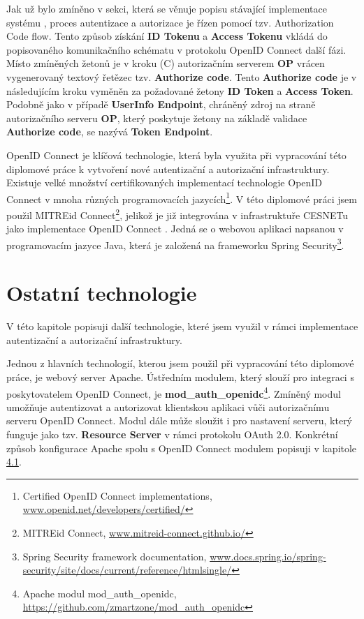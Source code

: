 \documentclass[
  printed, %
  twoside, %
  table,   %
  nolof,     %
  nolot,     %
]{fithesis3}
\begin{document}
Jak už bylo zmíněno v sekci, která se věnuje popisu stávající implementace systému , proces autentizace a autorizace je řízen pomocí tzv. Authorization Code flow. Tento způsob získání \textbf{ID Tokenu} a \textbf{Access Tokenu} vkládá do popisovaného komunikačního schématu v protokolu OpenID Connect další fázi. Místo zmíněných žetonů je v kroku (C) autorizačním serverem \textbf{OP} vrácen vygenerovaný textový řetězec tzv. \textbf{Authorize code}. Tento \textbf{Authorize code} je v následujícím kroku vyměněn za požadované žetony \textbf{ID Token} a \textbf{Access Token}. Podobně jako v případě \textbf{UserInfo Endpoint}, chráněný zdroj na straně autorizačního serveru \textbf{OP}, který poskytuje žetony na základě validace \textbf{Authorize code}, se nazývá \textbf{Token Endpoint}.

\par
OpenID Connect je klíčová technologie, která byla využita při vypracování této diplomové práce k vytvoření nové autentizační a autorizační infrastruktury. Existuje velké množství certifikovaných implementací technologie OpenID Connect v mnoha různých programovacích jazycích\footnote{Certified OpenID Connect implementations, \url{www.openid.net/developers/certified/}}. V této diplomové práci jsem použil MITREid Connect\footnote{MITREid Connect, \url{www.mitreid-connect.github.io/}}, jelikož je již integrována v infrastruktuře CESNETu jako implementace OpenID Connect \cite{oidcPresentation}. Jedná se o webovou aplikaci napsanou v programovacím jazyce Java, která je založená na frameworku Spring Security\footnote{Spring Security framework documentation, \url{www.docs.spring.io/spring-security/site/docs/current/reference/htmlsingle/}}. 

\section{Ostatní technologie}
V této kapitole popisuji další technologie, které jsem využil v rámci implementace autentizační a autorizační infrastruktury. 
\par
Jednou z hlavních technologií, kterou jsem použil při vypracování této diplomové práce, je webový server Apache. Ústředním modulem, který slouží pro integraci s poskytovatelem OpenID Connect, je \textbf{mod\_auth\_openidc}\footnote{Apache modul mod\_auth\_openidc, \url{https://github.com/zmartzone/mod\_auth\_openidc}}. Zmíněný modul umožňuje autentizovat a autorizovat klientskou aplikaci vůči autorizačnímu serveru OpenID Connect. Modul dále může sloužit i pro nastavení serveru, který funguje jako tzv. \textbf{Resource Server} v rámci protokolu OAuth 2.0. Konkrétní způsob konfigurace Apache spolu s OpenID Connect modulem popisuji v kapitole \hyperref[apacheConfig]{4.1}.
\end{document}
